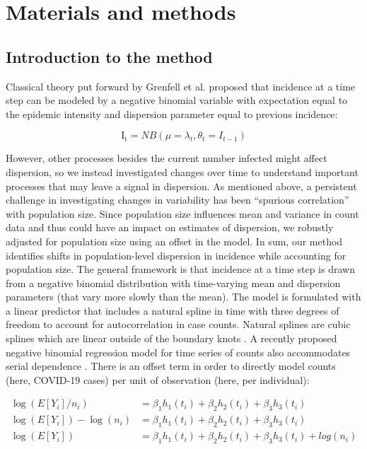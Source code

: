 \documentclass[10pt,letterpaper]{article}
\begin{document}
\section*{Materials and methods}
\subsection*{Introduction to the method}

Classical theory put forward by Grenfell et al. \cite{grenfell_dynamics_2002} proposed that incidence at a time step can be modeled by a negative binomial variable with expectation equal to the epidemic intensity and dispersion parameter equal to previous incidence:

\begin{equation}
    \mathrm{I_t} = NB(\mu = \lambda_t, \theta_t = I_{t-1})
\end{equation}

\noindent However, other processes besides the current number infected might affect dispersion, so we instead investigated changes over time to understand important processes that may leave a signal in dispersion. 
As mentioned above, a persistent challenge in investigating changes in variability has been ``spurious correlation'' with population size. 
Since population size influences mean and variance in count data and thus could have an impact on estimates of dispersion, we robustly adjusted for population size using an offset in the model. 
In sum, our method identifies shifts in population-level dispersion in incidence while accounting for population size. 
The general framework is that incidence at a time step is drawn from a negative binomial distribution with time-varying mean and dispersion parameters (that vary more slowly than the mean). 
The model is formulated with a linear predictor that includes a natural spline in time with three degrees of freedom to account for autocorrelation in case counts. 
Natural splines are cubic splines which are linear outside of the boundary knots \cite{perperoglou_review_2019}. 
A recently proposed negative binomial regression model for time series of counts also accommodates serial dependence \cite{davis_negative_2009}. 
There is an offset term in order to directly model counts (here, COVID-19 cases) per unit of observation (here, per individual):

\begin{align}
  \log(E[Y_i]/n_i) &= \beta_1h_1(t_i) + \beta_2h_2(t_i) + \beta_3h_3(t_i) \\
  \log(E[Y_i])-\log(n_i) &= \beta_1h_1(t_i) + \beta_2h_2(t_i) + \beta_3h_3(t_i) \\ 
  \log(E[Y_i]) &= \beta_1 h_1(t_i) + \beta_2h_2(t_i) + \beta_3 h_3(t_i) + log(n_i) 
\end{align}
\end{document}
